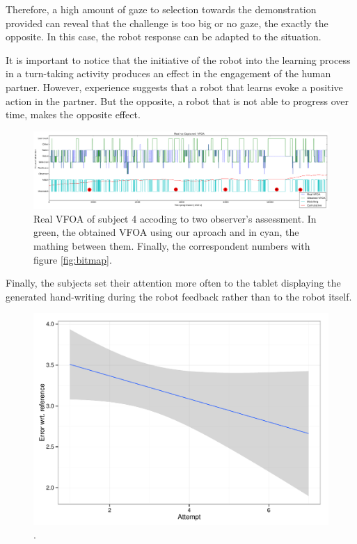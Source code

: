 \documentclass{sig-alternate}
\begin{document}
Therefore, a high amount of gaze to selection towards the demonstration provided can reveal that the challenge is too big or no gaze, the exactly the opposite. In this case, the robot response can be adapted to the situation. 

It is important to notice that the initiative of the robot into the learning process in a turn-taking activity produces an effect in the engagement of the human partner. However, experience suggests that a robot that learns evoke a positive action in the partner. But the opposite, a robot that is not able to progress over time, makes the opposite effect.

\begin{figure}
    \centering
    \includegraphics[width=1.81\columnwidth]{realCaptured}
    \caption{\small Real VFOA of subject 4 accoding to two observer's assessment. In green, the obtained VFOA using our aproach and in cyan, the mathing between them. Finally, the correspondent numbers with figure \ref{fig:bitmap}.}
    \label{fig:realCaptured}
\end{figure}

Finally, the subjects set their attention more often to the tablet displaying the generated hand-writing during the robot feedback rather than to the robot itself. 


\begin{figure}[h!]
    \centering
    \includegraphics[width=0.9\columnwidth]{errorR}
    \caption{\small .}
    \label{errorR}
\end{figure}
\end{document}
